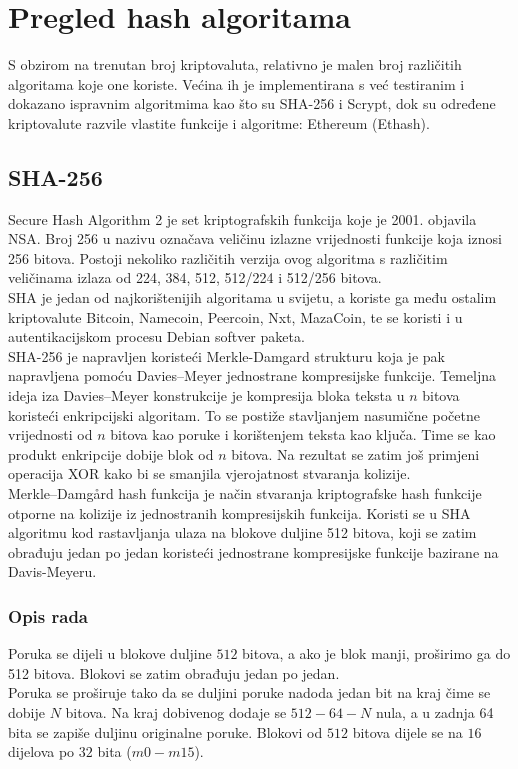 \documentclass[12pt]{article}
\begin{document}
\pagebreak
\section{Pregled hash algoritama}
S obzirom na trenutan broj kriptovaluta, relativno je malen broj različitih algoritama koje one koriste. Većina ih je implementirana s već testiranim i dokazano ispravnim algoritmima kao što su SHA-256 i Scrypt, dok su određene kriptovalute razvile vlastite funkcije i algoritme: Ethereum (Ethash).


\subsection{SHA-256}
Secure Hash Algorithm 2 je set kriptografskih funkcija koje je 2001. objavila NSA. Broj 256 u nazivu označava veličinu izlazne vrijednosti funkcije koja iznosi 256 bitova. Postoji nekoliko različitih verzija ovog algoritma s različitim veličinama izlaza od 224, 384, 512, 512/224 i 512/256 bitova. \\
SHA je jedan od najkorištenijih algoritama u svijetu, a koriste ga među ostalim kriptovalute Bitcoin, Namecoin, Peercoin, Nxt, MazaCoin, te se koristi i u autentikacijskom procesu Debian softver paketa. \\
SHA-256 je napravljen koristeći Merkle-Damgard strukturu koja je pak napravljena pomoću Davies–Meyer jednostrane kompresijske funkcije. Temeljna ideja iza Davies–Meyer konstrukcije je kompresija bloka teksta u $n$ bitova koristeći enkripcijski algoritam. To se postiže stavljanjem nasumične početne vrijednosti od $n$ bitova kao poruke i korištenjem teksta kao ključa. Time se kao produkt enkripcije dobije blok od $n$ bitova. Na rezultat se zatim još primjeni operacija XOR kako bi se smanjila vjerojatnost stvaranja kolizije. \\
Merkle–Damgård hash funkcija je način stvaranja kriptografske hash funkcije otporne na kolizije iz jednostranih kompresijskih funkcija. Koristi se u SHA algoritmu kod rastavljanja ulaza na blokove duljine 512 bitova, koji se zatim obrađuju jedan po jedan koristeći jednostrane kompresijske funkcije bazirane na Davis-Meyeru.

\subsubsection{Opis rada}
Poruka se dijeli u blokove duljine $512$ bitova, a ako je blok manji, proširimo ga do 512 bitova. Blokovi se zatim obrađuju jedan po jedan.\\
Poruka se proširuje tako da se duljini poruke  nadoda jedan bit na kraj čime se dobije $N$ bitova. Na kraj dobivenog dodaje se $512 - 64 - N$ nula, a u zadnja 64 bita se zapiše duljinu originalne poruke.
Blokovi od $512$ bitova dijele se na $16$ dijelova po $32$ bita ($m0 - m15$).\\
\end{document}

